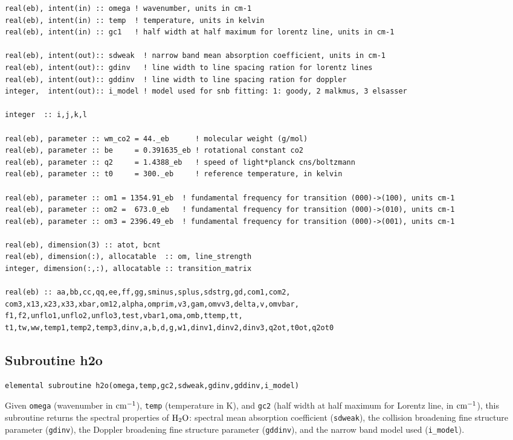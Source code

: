 \begin{lstlisting}
real(eb), intent(in) :: omega ! wavenumber, units in cm-1
real(eb), intent(in) :: temp  ! temperature, units in kelvin
real(eb), intent(in) :: gc1   ! half width at half maximum for lorentz line, units in cm-1

real(eb), intent(out):: sdweak  ! narrow band mean absorption coefficient, units in cm-1
real(eb), intent(out):: gdinv   ! line width to line spacing ration for lorentz lines
real(eb), intent(out):: gddinv  ! line width to line spacing ration for doppler
integer,  intent(out):: i_model ! model used for snb fitting: 1: goody, 2 malkmus, 3 elsasser

integer  :: i,j,k,l

real(eb), parameter :: wm_co2 = 44._eb      ! molecular weight (g/mol)
real(eb), parameter :: be     = 0.391635_eb ! rotational constant co2
real(eb), parameter :: q2     = 1.4388_eb   ! speed of light*planck cns/boltzmann
real(eb), parameter :: t0     = 300._eb     ! reference temperature, in kelvin

real(eb), parameter :: om1 = 1354.91_eb  ! fundamental frequency for transition (000)->(100), units cm-1
real(eb), parameter :: om2 =  673.0_eb   ! fundamental frequency for transition (000)->(010), units cm-1
real(eb), parameter :: om3 = 2396.49_eb  ! fundamental frequency for transition (000)->(001), units cm-1

real(eb), dimension(3) :: atot, bcnt
real(eb), dimension(:), allocatable  :: om, line_strength
integer, dimension(:,:), allocatable :: transition_matrix

real(eb) :: aa,bb,cc,qq,ee,ff,gg,sminus,splus,sdstrg,gd,com1,com2,
com3,x13,x23,x33,xbar,om12,alpha,omprim,v3,gam,omvv3,delta,v,omvbar,
f1,f2,unflo1,unflo2,unflo3,test,vbar1,oma,omb,ttemp,tt,
t1,tw,ww,temp1,temp2,temp3,dinv,a,b,d,g,w1,dinv1,dinv2,dinv3,q2ot,t0ot,q2ot0
\end{lstlisting}

\subsection{Subroutine h2o}

\begin{lstlisting}
elemental subroutine h2o(omega,temp,gc2,sdweak,gdinv,gddinv,i_model)
\end{lstlisting}
Given \verb=omega= (wavenumber in $\rm cm^{-1}$), \verb=temp= (temperature in K), and \verb=gc2= (half width at half maximum for Lorentz line, in $\rm cm^{-1}$), this subroutine returns the spectral properties of $\rm H_2O$: spectral mean absorption coefficient (\verb=sdweak=), the collision broadening fine structure parameter (\verb=gdinv=), the Doppler broadening fine structure parameter (\verb=gddinv=), and the narrow band model used (\verb=i_model=).

